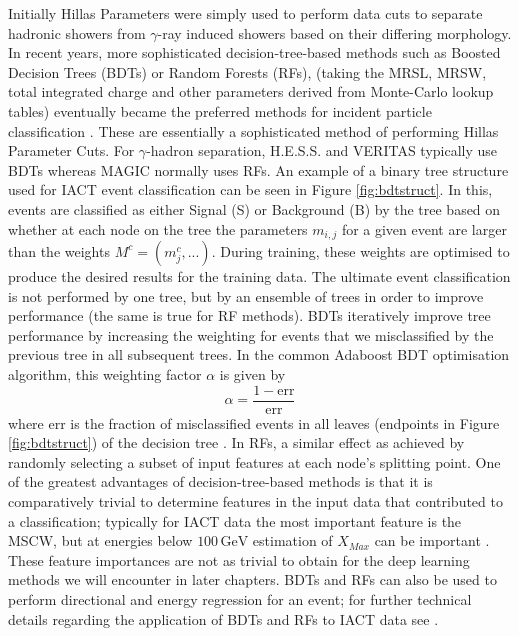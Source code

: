 Initially Hillas Parameters were simply used to perform data cuts to separate hadronic showers from $\gamma$-ray induced showers based on their differing morphology. In recent years, more sophisticated decision-tree-based methods such as Boosted Decision Trees (BDTs) or Random Forests (RFs),  (taking the MRSL, MRSW, total integrated charge and other parameters derived from Monte-Carlo lookup tables) eventually became the preferred methods for incident particle classification \cite{hessbdt}. These are essentially a sophisticated method of performing Hillas Parameter Cuts. For $\gamma$-hadron separation, H.E.S.S. \cite{hessbdt} and VERITAS \cite{evdisp} typically use BDTs whereas MAGIC normally uses RFs. An example of a binary tree structure used for IACT event classification can be seen in Figure \ref{fig:bdtstruct}. In this, events are classified as either Signal (S) or Background (B) by the tree based on whether at each node on the tree the parameters $m_{i,j}$ for a given event are larger than the weights $M^c=(m^c_j,...)$. During training, these weights are optimised to produce the desired results for the training data. The ultimate event classification is not performed by one tree, but by  an ensemble of trees in order to improve performance (the same is true for RF methods). BDTs iteratively improve tree performance by increasing the weighting for events that we misclassified by the previous tree in all subsequent trees. In the common Adaboost BDT optimisation algorithm, this weighting factor $\alpha$ is given by 
\begin{equation}
    \alpha=\frac{1-\mathrm{err}}{\mathrm{err}}
\end{equation}
where $\mathrm{err}$ is the fraction of misclassified events in all leaves (endpoints in Figure \ref{fig:bdtstruct}) of the decision tree \cite{hessbdt}. In RFs, a similar effect as achieved by randomly selecting a subset of input features at each node’s splitting point. One of the greatest advantages of decision-tree-based methods is that it is comparatively trivial to determine features in the input data that contributed to a classification; typically for IACT data the most important feature is the MSCW, but at energies below $\mathrm{100\,GeV}$ estimation of $X_{Max}$ can be important \cite{hessbdt}. These feature importances are not as trivial to obtain for the deep learning methods we will encounter in later chapters. BDTs and RFs can also be used to perform directional and energy regression for an event; for further technical details regarding the application of BDTs and RFs to IACT data see \cite{Sitarek1i} \cite{magictime} \cite{hessbdt} \cite{supermagictime} .

